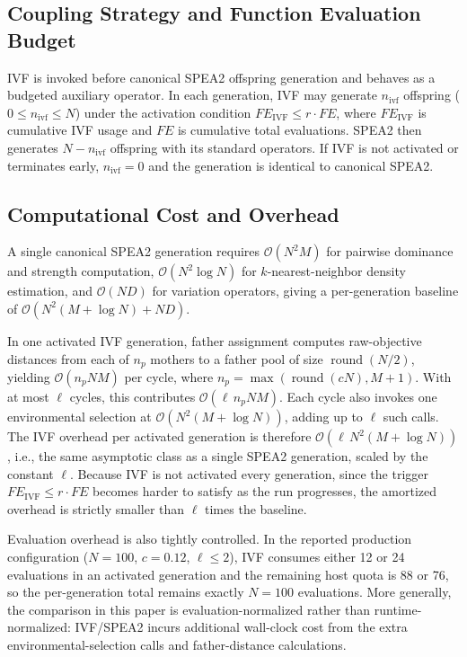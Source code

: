 \documentclass[pdflatex,sn-mathphys-ay]{sn-jnl}%
\theoremstyle{thmstyleone}%
\theoremstyle{thmstyletwo}%
\theoremstyle{thmstylethree}%
\begin{document}
\subsection{Coupling Strategy and Function Evaluation Budget}\label{subsec:coupling}
IVF is invoked before canonical SPEA2 offspring generation and behaves as a budgeted auxiliary operator. In each generation, IVF may generate $n_{\text{ivf}}$ offspring ($0 \le n_{\text{ivf}} \le N$) under the activation condition $FE_{\text{IVF}} \le r\cdot FE$, where $FE_{\text{IVF}}$ is cumulative IVF usage and $FE$ is cumulative total evaluations. SPEA2 then generates $N-n_{\text{ivf}}$ offspring with its standard operators. If IVF is not activated or terminates early, $n_{\text{ivf}}=0$ and the generation is identical to canonical SPEA2.

\subsection{Computational Cost and Overhead}\label{subsec:cost}
A single canonical SPEA2 generation requires $\mathcal{O}(N^2 M)$ for pairwise dominance and strength computation, $\mathcal{O}(N^2 \log N)$ for $k$-nearest-neighbor density estimation, and $\mathcal{O}(N D)$ for variation operators, giving a per-generation baseline of $\mathcal{O}(N^2(M + \log N) + ND)$.

In one activated IVF generation, father assignment computes raw-objective distances from each of $n_p$ mothers to a father pool of size $\operatorname{round}(N/2)$, yielding $\mathcal{O}(n_p N M)$ per cycle, where $n_p=\max(\operatorname{round}(cN),M+1)$. With at most $\ell$ cycles, this contributes $\mathcal{O}(\ell\, n_p N M)$. Each cycle also invokes one environmental selection at $\mathcal{O}(N^2(M + \log N))$, adding up to $\ell$ such calls. The IVF overhead per activated generation is therefore $\mathcal{O}(\ell\, N^2(M + \log N))$, i.e., the same asymptotic class as a single SPEA2 generation, scaled by the constant $\ell$. Because IVF is not activated every generation, since the trigger $FE_{\text{IVF}} \le r \cdot FE$ becomes harder to satisfy as the run progresses, the amortized overhead is strictly smaller than $\ell$ times the baseline.

Evaluation overhead is also tightly controlled. In the reported production configuration ($N=100$, $c=0.12$, $\ell\le2$), IVF consumes either 12 or 24 evaluations in an activated generation and the remaining host quota is 88 or 76, so the per-generation total remains exactly $N=100$ evaluations. More generally, the comparison in this paper is evaluation-normalized rather than runtime-normalized: IVF/SPEA2 incurs additional wall-clock cost from the extra environmental-selection calls and father-distance calculations.
\end{document}
